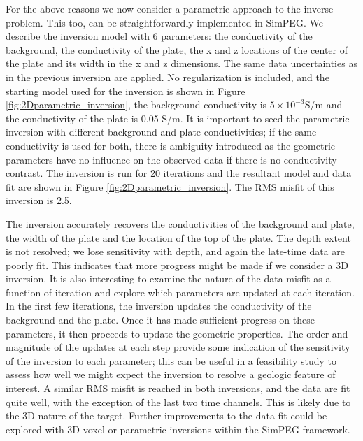 \documentclass[paper]{geophysics}
\begin{document}
For the above reasons we now consider a parametric approach to the inverse problem. This too, can be straightforwardly implemented in SimPEG. We describe the inversion model with 6 parameters: the conductivity of the background, the conductivity of the plate, the x and z locations of the center of the plate and its width in the x and z dimensions. The same data uncertainties as in the previous inversion are applied. No regularization is included, and the starting model used for the inversion is shown in Figure \ref{fig:2Dparametric_inversion}, the background conductivity is $5\times10^{-3}$S/m and the conductivity of the plate is 0.05 S/m. It is important to seed the parametric inversion with different background and plate conductivities; if the same conductivity is used for both, there is ambiguity introduced as the geometric parameters have no influence on the observed data if there is no conductivity contrast. The inversion is run for 20 iterations and the resultant model and data fit are shown in Figure \ref{fig:2Dparametric_inversion}. The RMS misfit of this inversion is 2.5.

The inversion accurately recovers the conductivities of the background and plate, the width of the plate and the location of the top of the plate. The depth extent is not resolved; we lose sensitivity with depth, and again the late-time data are poorly fit. This indicates that more progress might be made if we consider a 3D inversion. It is also interesting to examine the nature of the data misfit as a function of iteration and explore which parameters are updated at each iteration. In the first few iterations, the inversion updates the conductivity of the background and the plate. Once it has made sufficient progress on these parameters, it then proceeds to update the geometric properties. The order-and-magnitude of the updates at each step provide some indication of the sensitivity of the inversion to each parameter; this can be useful in a feasibility study to assess how well we might expect the inversion to resolve a geologic feature of interest.
A similar RMS misfit is reached in both inversions, and the data are fit quite well, with the exception of the last two time channels. This is likely due to the 3D nature of the target. Further improvements to the data fit could be explored with 3D voxel or parametric inversions within the SimPEG framework.
\end{document}
